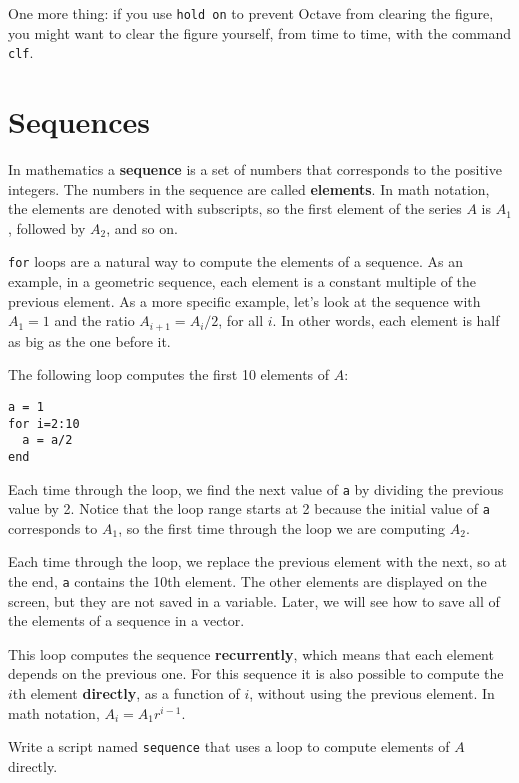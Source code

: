 One more thing: if you use {\tt hold on} to prevent Octave from
clearing the figure, you might want to clear the figure yourself,
from time to time, with the command {\tt clf}.


\section{Sequences}

In mathematics a {\bf sequence} is a set of numbers that corresponds
to the positive integers. The numbers in the sequence are
called {\bf elements}. In math notation, the elements
are denoted with subscripts, so the first element of the series $A$ is
$A_1$, followed by $A_2$, and so on.

{\tt for} loops are a natural way to compute the elements of a sequence.
As an example, in a geometric sequence, each element is a constant
multiple of the previous element. As a more specific example, let's
look at the sequence with $A_1 = 1$ and the ratio $A_{i+1} = A_i/2$,
for all $i$. In other words, each element is half as big as the one
before it.

The following loop computes the first 10 elements of $A$:

\begin{verbatim}
a = 1
for i=2:10
  a = a/2
end
\end{verbatim}

Each time through the loop, we find the next value of {\tt a}
by dividing the previous value by 2. Notice that the loop
range starts at 2 because the initial value of {\tt a} corresponds
to $A_1$, so the first time through the loop we are computing
$A_2$.

Each time through the loop, we replace the previous element with
the next, so at the end, {\tt a} contains the 10th element. The
other elements are displayed on the screen, but they are not saved
in a variable. Later, we will see how to save all of the elements
of a sequence in a vector.

This loop computes the sequence {\bf recurrently}, which means
that each element depends on the previous one.
For this sequence it is also possible to compute the $i$th element
{\bf directly}, as a function of $i$, without using the previous element.
In math notation, $A_i = A_1 r^{i-1}$. 

\begin{ex}
Write a
script named {\tt sequence} that uses a loop
to compute elements of $A$ directly.
\end{ex}


